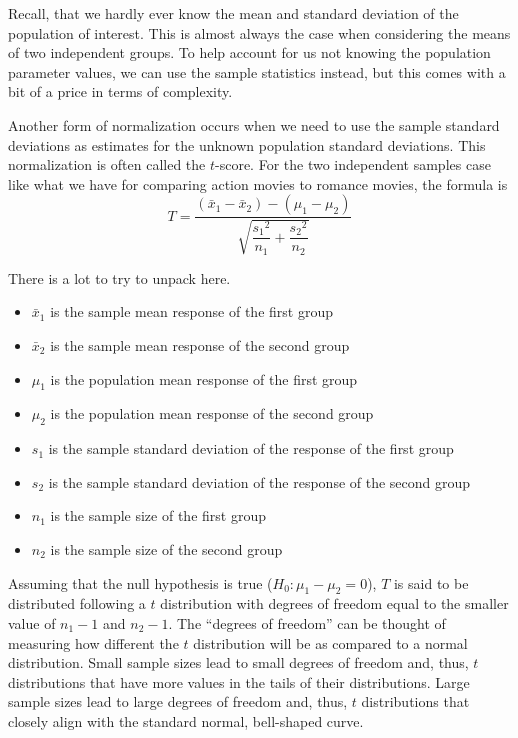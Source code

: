 \documentclass[12pt,]{krantz}
\providecommand{\tightlist}{%
  \setlength{\itemsep}{0pt}\setlength{\parskip}{0pt}}
\begin{document}
Recall, that we hardly ever know the mean and standard deviation of the
population of interest. This is almost always the case when considering
the means of two independent groups. To help account for us not knowing
the population parameter values, we can use the sample statistics
instead, but this comes with a bit of a price in terms of complexity.

Another form of normalization occurs when we need to use the sample
standard deviations as estimates for the unknown population standard
deviations. This normalization is often called the \(t\)-score. For the
two independent samples case like what we have for comparing action
movies to romance movies, the formula is
\[T =\dfrac{ (\bar{x}_1 - \bar{x}_2) - (\mu_1 - \mu_2)}{ \sqrt{\dfrac{{s_1}^2}{n_1} + \dfrac{{s_2}^2}{n_2}}  }\]

There is a lot to try to unpack here.

\begin{itemize}
\tightlist
\item
  \(\bar{x}_1\) is the sample mean response of the first group
\item
  \(\bar{x}_2\) is the sample mean response of the second group
\item
  \(\mu_1\) is the population mean response of the first group
\item
  \(\mu_2\) is the population mean response of the second group
\item
  \(s_1\) is the sample standard deviation of the response of the first
  group
\item
  \(s_2\) is the sample standard deviation of the response of the second
  group
\item
  \(n_1\) is the sample size of the first group
\item
  \(n_2\) is the sample size of the second group
\end{itemize}

Assuming that the null hypothesis is true (\(H_0: \mu_1 - \mu_2 = 0\)),
\(T\) is said to be distributed following a \(t\) distribution with
degrees of freedom equal to the smaller value of \(n_1 - 1\) and
\(n_2 - 1\). The ``degrees of freedom'' can be thought of measuring how
different the \(t\) distribution will be as compared to a normal
distribution. Small sample sizes lead to small degrees of freedom and,
thus, \(t\) distributions that have more values in the tails of their
distributions. Large sample sizes lead to large degrees of freedom and,
thus, \(t\) distributions that closely align with the standard normal,
bell-shaped curve.
\end{document}
